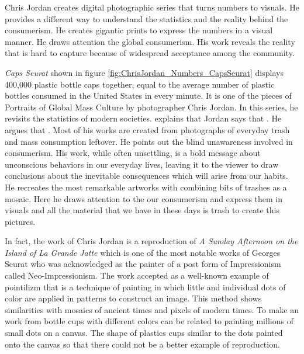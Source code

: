 Chris Jordan creates digital photographic series that turns numbers to visuals. He provides a different way to understand the statistics and the reality behind the consumerism. He creates gigantic prints to express the numbers in a visual manner. He draws attention the global consumerism. His work reveals the reality that is hard to capture because of widespread acceptance among the community.

\textit{Caps Seurat} shown in figure \ref{fig:ChrisJordan_Numbers_CapsSeurat} displays 400,000 plastic bottle caps together, equal to the average number of plastic bottles consumed in the United States in every minute. It is one of the pieces of Portraits of Global Mass Culture by photographer Chris Jordan. In this series, he revisits the statistics of modern societies. \cite{boustead2015impossible} explains that  Jordan says that  \citep[as cite in][]{boustead2015impossible}. He argues that  \citep[as cite in][]{boustead2015impossible}. Most of his works are created from photographs of everyday trash and mass consumption leftover. He points out the blind unawareness involved in consumerism. His work, while often unsettling, is a bold message about unconscious behaviors in our everyday lives, leaving it to the viewer to draw conclusions about the inevitable consequences which will arise from our habits. He recreates the most remarkable artworks with combining bits of trashes as a mosaic. Here he draws attention to the our consumerism and express them in visuals and all the material that we have in these days is trash to create this pictures.

In fact, the work of Chris Jordan is a reproduction of \textit{A Sunday Afternoon on the Island of La Grande Jatte} which is one of the most notable works of Georges Seurat who was acknowledged as the painter of a post form of Impressionism called Neo-Impressionism. The work accepted as a well-known example of pointilizm that is a technique of painting in which little and individual dots of color are applied in patterns to construct an image. This method shows similarities with mosaics of ancient times and pixels of modern times. To make an work from bottle cups with different colors can be related to painting millions of small dots on a canvas. The shape of plastics cups similar to the dots painted onto the canvas so that there could not be a better example of reproduction.


